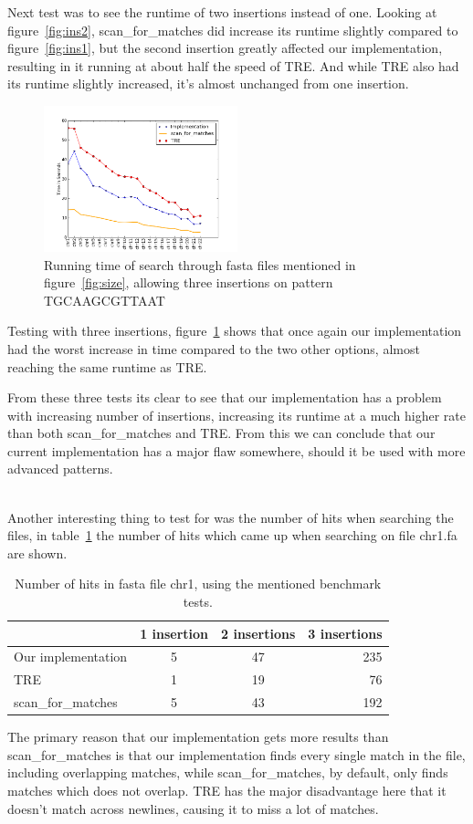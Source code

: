 Next test was to see the runtime of two insertions instead of one. Looking at figure~\ref{fig:ins2}, scan\_for\_matches did increase its runtime slightly compared to figure~\ref{fig:ins1}, but the second insertion greatly affected our implementation, resulting in it running at about half the speed of TRE.  And while TRE also had its runtime slightly increased, it's almost unchanged from one insertion.

\begin{figure}[h!]
\centering
\includegraphics[width=0.5\textwidth]{Benchmarking/3ins.png}
\caption{Running time of search through fasta files mentioned in figure~\ref{fig:size},  allowing three insertions on pattern TGCAAGCGTTAAT}
\label{fig:ins3}
\end{figure}
Testing with three insertions, figure~\ref{fig:ins3} shows that once again our implementation had the worst increase in time compared to the two other options, almost reaching the same runtime as TRE.


From these three tests its clear to see that our implementation has a problem with increasing number of insertions, increasing its runtime at a much higher rate than both scan\_for\_matches and TRE. From this we can conclude that our current implementation has a major flaw somewhere, should it be used with more advanced patterns. 
\\
~

Another interesting thing to test for was the number of hits when searching the files, in table~\ref{tab:hits} the number of hits which came up when searching on file chr1.fa are shown.

\begin{table}[h!]
\centering
\begin{tabular}{ l | c c r }
& 1 insertion & 2 insertions & 3 insertions\\
\hline
Our implementation& 5 &  47 & 235 \\
TRE& 1 & 19 & 76 \\
scan\_for\_matches & 5 & 43  & 192 \\
\end{tabular}
\caption{Number of hits in fasta file chr1, using the mentioned benchmark tests.}
\label{tab:hits}
\end{table}

The primary reason that our implementation gets more results than scan\_for\_matches is that our implementation finds every single match in the file, including overlapping matches, while scan\_for\_matches, by default, only finds matches which does not overlap. TRE has the major disadvantage here that it doesn't match across newlines, causing it to miss a lot of matches.

